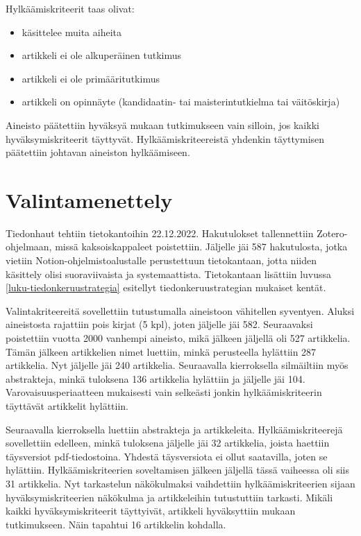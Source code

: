 \documentclass[utf8]{gradu3}
\begin{document}
Hylkäämiskriteerit taas olivat:

\begin{itemize}
    \item käsittelee muita aiheita
    \item artikkeli ei ole alkuperäinen tutkimus
    \item artikkeli ei ole primääritutkimus
    \item artikkeli on opinnäyte (kandidaatin- tai maisterintutkielma tai väitöskirja)
\end{itemize}

Aineisto päätettiin hyväksyä mukaan tutkimukseen vain silloin, jos kaikki hyväksymiskriteerit täyttyvät. Hylkäämiskriteereistä yhdenkin täyttymisen päätettiin johtavan aineiston hylkäämiseen.

\section{Valintamenettely}

Tiedonhaut tehtiin tietokantoihin 22.12.2022. Hakutulokset tallennettiin Zotero-ohjelmaan, missä kaksoiskappaleet poistettiin. Jäljelle jäi 587 hakutulosta, jotka vietiin Notion-ohjelmistoalustalle perustettuun tietokantaan, jotta niiden käsittely olisi suoraviivaista ja systemaattista. Tietokantaan lisättiin luvussa \ref{luku-tiedonkeruustrategia} esitellyt tiedonkeruustrategian mukaiset kentät.

Valintakriteereitä sovellettiin tutustumalla aineistoon vähitellen syventyen. Aluksi  aineistosta rajattiin pois kirjat (5 kpl), joten jäljelle jäi 582. Seuraavaksi poistettiin vuotta 2000 vanhempi aineisto, mikä jälkeen jäljellä oli 527 artikkelia. Tämän jälkeen artikkelien nimet luettiin, minkä perusteella hylättiin 287 artikkelia. Nyt jäljelle jäi 240 artikkelia. Seuraavalla kierroksella silmäiltiin myös abstrakteja, minkä tuloksena 136 artikkelia hylättiin ja jäljelle jäi 104. Varovaisuusperiaatteen mukaisesti vain selkeästi jonkin hylkäämiskriteerin täyttävät artikkelit hylättiin.

Seuraavalla kierroksella luettiin abstrakteja ja artikkeleita. Hylkäämiskriteerejä sovellettiin edelleen, minkä tuloksena jäljelle jäi 32 artikkelia, joista haettiin täysversiot pdf-tiedostoina. Yhdestä täysversiota ei ollut saatavilla, joten se hylättiin. Hylkäämiskriteerien soveltamisen jälkeen jäljellä tässä vaiheessa oli siis 31 artikkelia. Nyt tarkastelun näkökulmaksi vaihdettiin hylkäämiskriteerien sijaan hyväksymiskriteerien näkökulma ja artikkeleihin tutustuttiin tarkasti. Mikäli kaikki hyväksymiskriteerit täyttyivät, artikkeli hyväksyttiin mukaan tutkimukseen. Näin tapahtui 16 artikkelin kohdalla.
\end{document}
